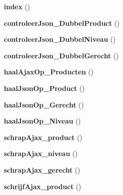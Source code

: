 \begin{DoxyCompactItemize}
\item 
\mbox{\label{class_admin_a149eb92716c1084a935e04a8d95f7347}} 
{\bfseries index} ()
\item 
\mbox{\label{class_admin_ad5ce40d8b615469d8317b6f0dcb71b2b}} 
{\bfseries controleer\+Json\+\_\+\+Dubbel\+Product} ()
\item 
\mbox{\label{class_admin_aec1c53647c7041ecbccd929a59ee29e0}} 
{\bfseries controleer\+Json\+\_\+\+Dubbel\+Niveau} ()
\item 
\mbox{\label{class_admin_ae152a83b9e9555f7c57a2f02aebd5437}} 
{\bfseries controleer\+Json\+\_\+\+Dubbel\+Gerecht} ()
\item 
\mbox{\label{class_admin_ac16bed1e3a8b0ef24594f04e4631f18b}} 
{\bfseries haal\+Ajax\+Op\+\_\+\+Producten} ()
\item 
\mbox{\label{class_admin_adc13ff1bd6e7b93df1b09767de15c3ed}} 
{\bfseries haal\+Json\+Op\+\_\+\+Product} ()
\item 
\mbox{\label{class_admin_a46ed62e22d9e0a4c197a07a054445986}} 
{\bfseries haal\+Json\+Op\+\_\+\+Gerecht} ()
\item 
\mbox{\label{class_admin_a03d8675f2b8104dcdc97b2ec84c67d8c}} 
{\bfseries haal\+Json\+Op\+\_\+\+Niveau} ()
\item 
\mbox{\label{class_admin_a37501312a5761249ee990692776a7359}} 
{\bfseries schrap\+Ajax\+\_\+product} ()
\item 
\mbox{\label{class_admin_a2a17426e14011241f9f4bddfc6fb1a5d}} 
{\bfseries schrap\+Ajax\+\_\+niveau} ()
\item 
\mbox{\label{class_admin_a089cb269e147ae5b6603e1b63cd456e3}} 
{\bfseries schrap\+Ajax\+\_\+gerecht} ()
\item 
\mbox{\label{class_admin_abaa698b6677d3969d33363feb2a3f06f}} 
{\bfseries schrijf\+Ajax\+\_\+product} ()
\end{DoxyCompactItemize}
